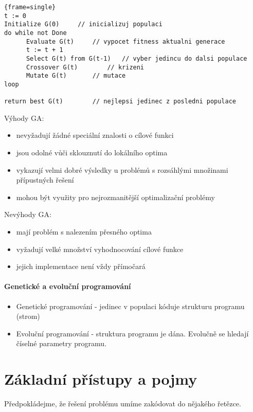 \documentclass[a4paper]{article}      %
\begin{document}
\begin{lstlisting}{frame=single}
t := 0
Initialize G(0)		// inicializuj populaci 
do while not Done
      Evaluate G(t)		// vypocet fitness aktualni generace
      t := t + 1
      Select G(t) from G(t-1)	// vyber jedincu do dalsi populace
      Crossover G(t)		// krizeni
      Mutate G(t)		// mutace
loop

return best G(t)		// nejlepsi jedinec z posledni populace
\end{lstlisting}

Výhody GA:
\begin{itemize}
	\item nevyžadují žádné speciální znalosti o cílové funkci
	\item jsou odolné vůči sklouznutí do lokálního optima
	\item vykazují velmi dobré výsledky u problémů s rozsáhlými množinami přípustných řešení
	\item mohou být využity pro nejrozmanitější optimalizační problémy
\end{itemize}

Nevýhody GA:
\begin{itemize}
	\item mají problém s nalezením přesného optima
	\item vyžadují velké množství vyhodnocování cílové funkce
	\item jejich implementace není vždy přímočará 
\end{itemize}

\paragraph{Genetické a evoluční programování}
\begin{itemize}
\item Genetické programování - jedinec v populaci kóduje strukturu programu (strom)
\item Evoluční programování - struktura programu je dána. Evolučně se hledají číselné parametry programu.
\end{itemize}
\section{Základní přístupy a pojmy}
Předpokládejme, že řešení problému umíme zakódovat do nějakého řetězce.
\end{document}

